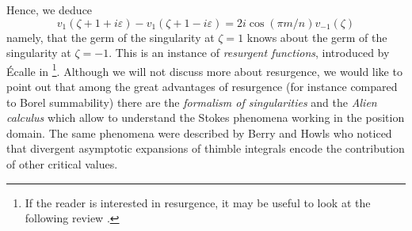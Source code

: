 \documentclass{article}
\theoremstyle{definition}
\theoremstyle{plain}
\begin{document}
Hence, we deduce  
\begin{equation}\label{resurgent-relation-1}
    v_1(\zeta+1+i\varepsilon)-v_1(\zeta+1-i\varepsilon)=2i \cos(\pi m/n)  v_{-1}(\zeta)
\end{equation}
namely, that the germ of the singularity at $\zeta=1$ knows about the germ of the singularity at $\zeta=-1$. This is an instance of \textit{resurgent functions}, introduced by \'Ecalle in \cite{EcalleI,EcalleII,EcalleIII}\footnote{If the reader is interested in resurgence, it may be useful to look at the following review \cite{diverg-resurg-i,Dorigoni,aniceto2019primer}.}. Although we will not discuss more about resurgence, we would like to point out that among the great advantages of resurgence (for instance compared to Borel summability) there are the \textit{formalism of singularities} and the \textit{Alien calculus} which allow to understand the Stokes phenomena working in the position domain. The same phenomena were described by Berry and Howls \cite{Berry_Howls} who noticed that divergent asymptotic expansions of thimble integrals encode the contribution of other critical values. 
\end{document}
